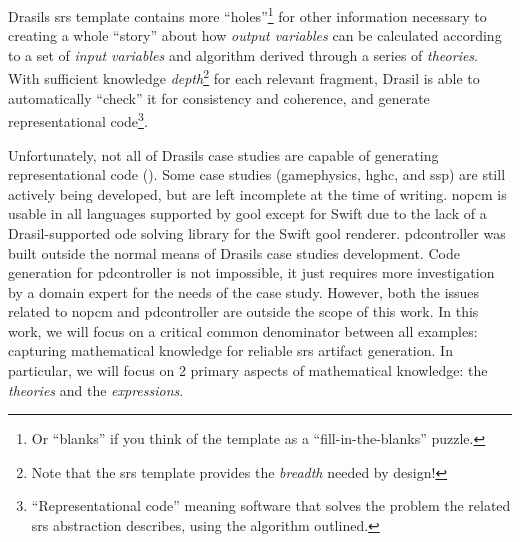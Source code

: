 Drasils \acs{srs} template contains more ``holes''\footnote{Or ``blanks'' if you
      think of the template as a ``fill-in-the-blanks'' puzzle.} for other
information necessary to creating a whole ``story'' about how
\textit{output variables} can be calculated according to a set of
\textit{input variables} and algorithm derived through a series of
\textit{theories}. With sufficient knowledge \textit{depth}\footnote{Note
      that the \acs{srs} template provides the \textit{breadth} needed by
      design!} for each relevant fragment, Drasil is able to automatically
``check'' it for consistency and coherence, and generate representational
code\footnote{``Representational code'' meaning software that solves the
      problem the related \acs{srs} abstraction describes, using the algorithm
      outlined.}.

Unfortunately, not all of Drasils case studies are capable of generating
representational code (). Some case studies
(\acs{gamephysics}, \acs{hghc}, and \acs{ssp}) are still actively being
developed, but are left incomplete at the time of writing. \acs{nopcm} is usable
in all languages supported by \acs{gool} except for Swift due to the lack of a
Drasil-supported \acs{ode} solving library for the Swift \acs{gool} renderer.
\acs{pdcontroller} was built \cite{DrasilPR2289Naveen} outside  the normal means
of Drasils case studies development. Code generation for \acs{pdcontroller} is
not impossible, it just requires more investigation by a domain expert for the
needs of the case study. However, both the issues related to \acs{nopcm} and
\acs{pdcontroller} are outside the scope of this work. In this work, we will
focus on a critical common denominator between all examples: capturing
mathematical knowledge for reliable \acs{srs} artifact generation. In
particular, we will focus on 2 primary aspects of mathematical knowledge: the
\textit{theories} and the \textit{expressions}.

\caseStudiesCodeTable{}
